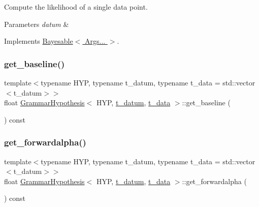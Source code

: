 Compute the likelihood of a single data point. 


\begin{DoxyParams}{Parameters}
{\em datum} & \\
\hline
\end{DoxyParams}


Implements \hyperlink{class_bayesable_a5e0237ec7a40a2c45c990f93a8dc8e00}{Bayesable$<$ Args... $>$}.

\mbox{\label{class_grammar_hypothesis_aa647148b440db9de4ca97f39c593a0d3}} 
\subsubsection{\texorpdfstring{get\+\_\+baseline()}{get\_baseline()}}
{\footnotesize\ttfamily template$<$typename H\+YP, typename t\+\_\+datum, typename t\+\_\+data = std\+::vector$<$t\+\_\+datum$>$$>$ \\
float \hyperlink{class_grammar_hypothesis}{Grammar\+Hypothesis}$<$ H\+YP, \hyperlink{class_bayesable_a7c93a2eeab708378eb321745908718d4}{t\+\_\+datum}, \hyperlink{class_bayesable_a70a593a67c7d43239ecc06bb4fd06a6b}{t\+\_\+data} $>$\+::get\+\_\+baseline (\begin{DoxyParamCaption}{ }\end{DoxyParamCaption}) const\hspace{0.3cm}{\ttfamily [inline]}}

\mbox{\label{class_grammar_hypothesis_a8ac03e561e97660e21669d0ddb64e028}} 
\subsubsection{\texorpdfstring{get\+\_\+forwardalpha()}{get\_forwardalpha()}}
{\footnotesize\ttfamily template$<$typename H\+YP, typename t\+\_\+datum, typename t\+\_\+data = std\+::vector$<$t\+\_\+datum$>$$>$ \\
float \hyperlink{class_grammar_hypothesis}{Grammar\+Hypothesis}$<$ H\+YP, \hyperlink{class_bayesable_a7c93a2eeab708378eb321745908718d4}{t\+\_\+datum}, \hyperlink{class_bayesable_a70a593a67c7d43239ecc06bb4fd06a6b}{t\+\_\+data} $>$\+::get\+\_\+forwardalpha (\begin{DoxyParamCaption}{ }\end{DoxyParamCaption}) const\hspace{0.3cm}{\ttfamily [inline]}}

